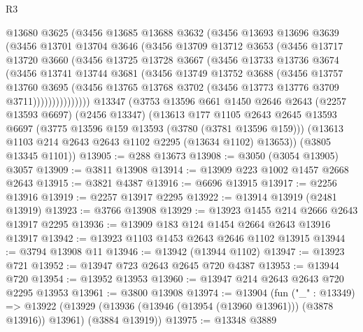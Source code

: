 \begin{lexlean}{R3}
\begin{coremodule}
          @13680
          @3625
          (@3456
            @13685
            @13688
            @3632
            (@3456
              @13693
              @13696
              @3639
              (@3456
                @13701
                @13704
                @3646
                (@3456
                  @13709
                  @13712
                  @3653
                  (@3456
                    @13717
                    @13720
                    @3660
                    (@3456
                      @13725
                      @13728
                      @3667
                      (@3456
                        @13733
                        @13736
                        @3674
                        (@3456
                          @13741
                          @13744
                          @3681
                          (@3456
                            @13749
                            @13752
                            @3688
                            (@3456
                              @13757
                              @13760
                              @3695
                              (@3456
                                @13765
                                @13768
                                @3702
                                (@3456 @13773 @13776 @3709 @3711)))))))))))))))
    @13347
    (@3753
      @13596
      @661
      @1450
      @2646
      @2643
      (@2257 @13593 @6697)
      (@2456 @13347)
      (@13613
        @177
        @1105
        @2643
        @2645
        @13593
        @6697
        (@3775 @13596 @159 @13593 (@3780 (@3781 @13596 @159)))
        (@13613 @1103 @214 @2643 @2643 @1102 @2295 (@13634 @1102) @13653))
      (@3805 @13345 @1101))
@13905 := @288 @13673
@13908 := @3050 (@3054 @13905) @3057
@13909 := @3811 @13908
@13914 := @13909 @223 @1002 @1457 @2668 @2643
@13915 := @3821 @4387
@13916 := @6696 @13915
@13917 := @2256 @13916
@13919 := @2257 @13917 @2295
@13922 := @13914 @13919 (@2481 @13919)
@13923 := @3766 @13908
@13929 := @13923 @1455 @214 @2666 @2643 @13917 @2295
@13936 := @13909 @183 @124 @1454 @2664 @2643 @13916 @13917
@13942 := @13923 @1103 @1453 @2643 @2646 @1102 @13915
@13944 := @3794 @13908 @11
@13946 := @13942 (@13944 @1102)
@13947 := @13923 @721
@13952 := @13947 @723 @2643 @2645 @720 @4387
@13953 := @13944 @720
@13954 := @13952 @13953
@13960 := @13947 @214 @2643 @2643 @720 @2295 @13953
@13961 := @3800 @13908
@13974 := @13904
    (fun ("_" : @13349) =>
    @13922 (@13929 (@13936 (@13946 (@13954 (@13960 @13961))) (@3878 @13916)) @13961) (@3884 @13919))
@13975 := @13348 @3889

\end{coremodule}
\end{lexlean}
